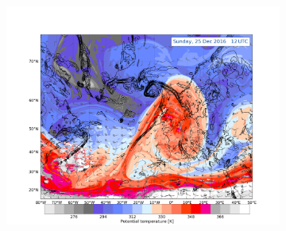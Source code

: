 \begin{figure}[h!]
    \begin{subfigure}[b]{\textwidth}
        \includegraphics[trim={4.2cm 0cm 4.3cm 36.8cm},clip,
        width=\textwidth]{./fig_DynTropo/20161225_12}
    \end{subfigure}
\end{figure}
%
